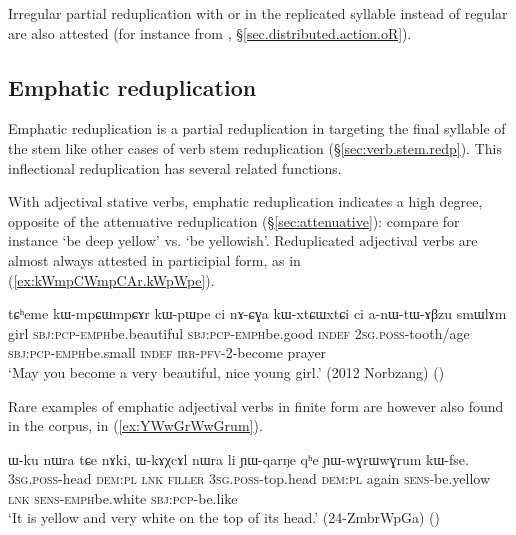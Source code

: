 Irregular partial reduplication with  or  in the replicated syllable instead of regular   are also attested (for instance  from  , §\ref{sec.distributed.action.oR}).
 
\subsection{Emphatic reduplication} \label{sec:emph.redp}
Emphatic reduplication is a partial reduplication in  targeting the final syllable of the stem like other cases of verb stem reduplication (§\ref{sec:verb.stem.redp}). This inflectional reduplication has several related functions.

With adjectival stative verbs,  emphatic reduplication indicates a high degree, opposite of the attenuative reduplication (§\ref{sec:attenuative}): compare for instance  `be deep yellow' vs.  `be yellowish'. Reduplicated adjectival verbs are almost always attested in participial form, as in (\ref{ex:kWmpCWmpCAr.kWpWpe}). 


\begin{exe}
\ex \label{ex:kWmpCWmpCAr.kWpWpe}
\gll tɕʰeme kɯ-mpɕɯ\redp{}mpɕɤr kɯ-pɯ\redp{}pe ci nɤ-ɕɣa  kɯ-xtɕɯ\redp{}xtɕi ci a-nɯ-tɯ-ɤβzu smɯlɤm \\
girl \textsc{sbj}:\textsc{pcp}-\textsc{emph}\redp{}be.beautiful \textsc{sbj}:\textsc{pcp}-\textsc{emph}\redp{}be.good \textsc{indef} \textsc{2sg}.\textsc{poss}-tooth/age  \textsc{sbj}:\textsc{pcp}-\textsc{emph}\redp{}be.small \textsc{indef} \textsc{irr}-\textsc{pfv}-2-become prayer \\
\glt `May you become a very beautiful, nice young girl.' (2012 Norbzang) ()
\end{exe}

Rare examples of emphatic adjectival verbs in finite form are however also found in the corpus, in (\ref{ex:YWwGrWwGrum}).

\begin{exe}
\ex \label{ex:YWwGrWwGrum}
\gll ɯ-ku nɯra tɕe nɤki, ɯ-kɤχcɤl nɯra li ɲɯ-qarŋe qʰe ɲɯ-wɣrɯ\redp{}wɣrum kɯ-fse. \\
\textsc{3sg}.\textsc{poss}-head \textsc{dem}:\textsc{pl} \textsc{lnk} \textsc{filler} \textsc{3sg}.\textsc{poss}-top.head  \textsc{dem}:\textsc{pl} again \textsc{sens}-be.yellow \textsc{lnk} \textsc{sens}-\textsc{emph}\redp{}be.white \textsc{sbj}:\textsc{pcp}-be.like \\
\glt `It is yellow and very white on the top of its head.' (24-ZmbrWpGa)
()
\end{exe}

